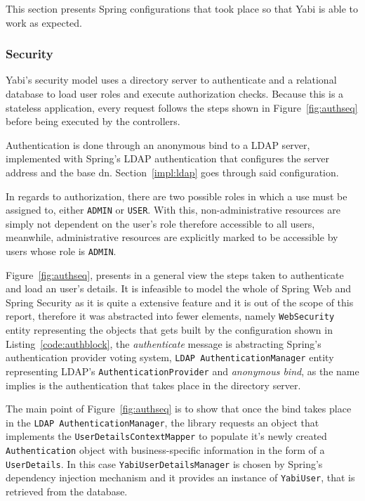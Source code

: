 This section presents Spring configurations that took place so that \gls{Yabi} is able to work as expected.

\subsubsection{Security}
\gls{Yabi}'s security model uses a directory server to authenticate and a relational database to load user roles and execute authorization checks. Because this is a stateless application, every request follows the steps shown in Figure~\ref{fig:authseq} before being executed by the controllers.

Authentication is done through an anonymous bind to a \gls{LDAP} server, implemented with Spring's \gls{LDAP} authentication that configures the server address and the base \gls{dn}. Section~\ref{impl:ldap} goes through said configuration.

In regards to authorization, there are two possible roles in which a use must be assigned to, either \texttt{ADMIN} or \texttt{USER}. With this, non-administrative resources are simply not dependent on the user's role therefore accessible to all users, meanwhile, administrative resources are explicitly marked to be accessible by users whose role is \texttt{ADMIN}.

Figure~\ref{fig:authseq}, presents in a general view the steps taken to authenticate and load an user's details. It is infeasible to model the whole of Spring Web and Spring Security as it is quite a extensive feature and it is out of the scope of this report, therefore it was abstracted into fewer elements, namely \texttt{WebSecurity} entity representing the objects that gets built by the configuration shown in Listing~\ref{code:authblock}, the \textit{authenticate} message is abstracting Spring's authentication provider voting system, \texttt{LDAP AuthenticationManager} entity representing \gls{LDAP}'s \texttt{AuthenticationProvider} and \textit{anonymous bind}, as the name implies is the authentication that takes place in the directory server.

The main point of Figure~\ref{fig:authseq} is to show that once the bind takes place in the \texttt{LDAP AuthenticationManager}, the library requests an object that implements the \texttt{UserDetailsContextMapper} to populate it's newly created \texttt{Authentication} object with business-specific information in the form of a \texttt{UserDetails}. In this case \texttt{YabiUserDetailsManager} is chosen by Spring's dependency injection mechanism and it provides an instance of \texttt{YabiUser}, that is retrieved from the database.

